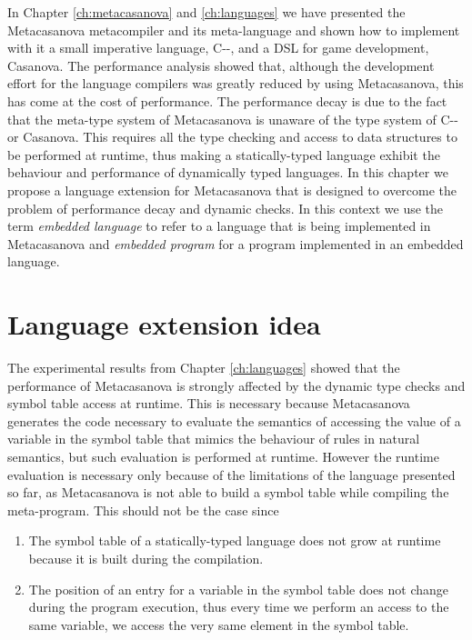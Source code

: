 In Chapter \ref{ch:metacasanova} and \ref{ch:languages} we have presented the Metacasanova metacompiler and its meta-language and shown how to implement with it a small imperative language, C-{}-, and a DSL for game development, Casanova. The performance analysis showed that, although the development effort for the language compilers was greatly reduced by using Metacasanova, this has come at the cost of performance. The performance decay is due to the fact that the meta-type system of Metacasanova is unaware of the type system of C-{}- or Casanova. This requires all the type checking and access to data structures to be performed at runtime, thus making a statically-typed language exhibit the behaviour and performance of dynamically typed languages. In this chapter we propose a language extension \cite{DiGiacomo2017SLE} for Metacasanova that is designed to overcome the problem of performance decay and dynamic checks. In this context we use the term \textit{embedded language} to refer to a language that is being implemented in Metacasanova and \textit{embedded program} for a program implemented in an embedded language.

\section{Language extension idea}
\label{sec:ch_functors_idea}
The experimental results from Chapter \ref{ch:languages} showed that the performance of Metacasanova is strongly affected by the dynamic type checks and symbol table access at runtime. This is necessary because Metacasanova generates the code necessary to evaluate the semantics of accessing the value of a variable in the symbol table that mimics the behaviour of rules in natural semantics, but such evaluation is performed at runtime. However the runtime evaluation is necessary only because of the limitations of the language presented so far, as Metacasanova is not able to build a symbol table while compiling the meta-program. This should not be the case since

\begin{enumerate}
	\item The symbol table of a statically-typed language does not grow at runtime because it is built during the compilation.
	\item The position of an entry for a variable in the symbol table does not change during the program execution, thus every time we perform an access to the same variable, we access the very same element in the symbol table.
\end{enumerate}

